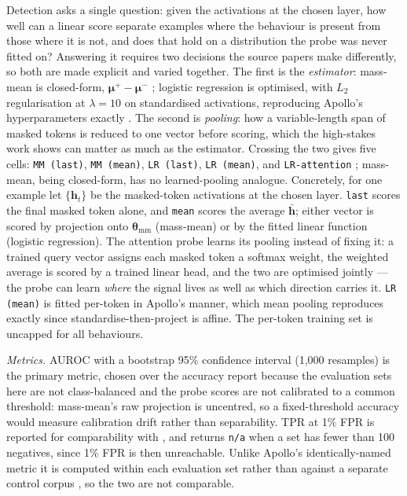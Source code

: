 \documentclass[conference]{IEEEtran}
\begin{document}
Detection asks a single question: given the activations at the chosen layer, how
well can a linear score separate examples where the behaviour is present from
those where it is not, and does that hold on a distribution the probe was never
fitted on? Answering it requires two decisions the source papers make
differently, so both are made explicit and varied together. The first is the
\emph{estimator}: mass-mean is closed-form,
$\boldsymbol{\mu}^{+}-\boldsymbol{\mu}^{-}$ \citep{marks2024}; logistic
regression is optimised, with $L_2$ regularisation at $\lambda=10$ on
standardised activations, reproducing Apollo's hyperparameters exactly
\citep{goldowsky2025}. The second is \emph{pooling}: how a variable-length span
of masked tokens is reduced to one vector before scoring, which the high-stakes
work shows can matter as much as the estimator. Crossing the two gives five
cells: \texttt{MM (last)}, \texttt{MM (mean)}, \texttt{LR (last)},
\texttt{LR (mean)}, and \texttt{LR-attention}
\citep{mckenzie2025,kantamneni2025}; mass-mean, being closed-form, has
no learned-pooling analogue. Concretely, for one example let
$\{\mathbf{h}_t\}$ be the masked-token activations at the chosen layer.
\texttt{last} scores the final masked token alone, and \texttt{mean} scores the
average $\bar{\mathbf{h}}$; either vector is scored by projection onto
$\boldsymbol{\theta}_{\mathrm{mm}}$ (mass-mean) or by the fitted linear
function (logistic regression). The attention probe learns its pooling instead
of fixing it: a trained query vector assigns each masked token a softmax
weight, the weighted average is scored by a trained linear head, and the two
are optimised jointly --- the probe can learn \emph{where} the signal lives as
well as which direction carries it. \texttt{LR (mean)} is fitted per-token in
Apollo's manner, which mean pooling reproduces exactly since
standardise-then-project is affine. The per-token training set is uncapped for
all behaviours.

\emph{Metrics.} AUROC with a bootstrap 95\% confidence interval (1{,}000
resamples) is the primary metric, chosen over the accuracy \citet{marks2024}
report because the evaluation sets here are not class-balanced and the probe
scores are not calibrated to a common threshold: mass-mean's raw projection is
uncentred, so a fixed-threshold accuracy would measure calibration drift
rather than separability. TPR at 1\% FPR is reported for comparability with
\citet{mckenzie2025}, and returns \texttt{n/a} when a set has fewer than 100
negatives, since 1\% FPR is then unreachable. Unlike Apollo's identically-named
metric it is computed within each evaluation set rather than against a separate
control corpus \citep{taori2023}, so the two are not comparable.
\end{document}
